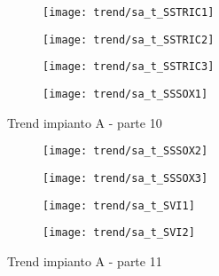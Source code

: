 \begin{sidewaysfigure}[h]\ContinuedFloat
	\renewcommand*\thesubfigure{(\arabic{subfigure})}
	\begin{subfigure}{0.49\textwidth}
		\texttt{[image: trend/sa\_t\_SSTRIC1]}
		\caption{}
		\centering
	\end{subfigure}
	\begin{subfigure}{0.49\textwidth}
		\texttt{[image: trend/sa\_t\_SSTRIC2]}
		\caption{}
		\centering
	\end{subfigure}

	\begin{subfigure}{0.49\textwidth}
		\texttt{[image: trend/sa\_t\_SSTRIC3]}
		\caption{}
		\centering
	\end{subfigure}
	\begin{subfigure}{0.49\textwidth}
		\texttt{[image: trend/sa\_t\_SSSOX1]}	
		\caption{}
		\centering
	\end{subfigure}
	\caption{Trend impianto A - parte 10}
\end{sidewaysfigure}

\begin{sidewaysfigure}[h]\ContinuedFloat
	\renewcommand*\thesubfigure{(\arabic{subfigure})}
	\begin{subfigure}{0.49\textwidth}
		\texttt{[image: trend/sa\_t\_SSSOX2]}
		\caption{}
		\centering
	\end{subfigure}
	\begin{subfigure}{0.49\textwidth}
		\texttt{[image: trend/sa\_t\_SSSOX3]}
		\caption{}
		\centering
	\end{subfigure}

	\begin{subfigure}{0.49\textwidth}
		\texttt{[image: trend/sa\_t\_SVI1]}
		\caption{}
		\centering
	\end{subfigure}
	\begin{subfigure}{0.49\textwidth}
		\texttt{[image: trend/sa\_t\_SVI2]}	
		\caption{}
		\centering
	\end{subfigure}
	\caption{Trend impianto A - parte 11}
\end{sidewaysfigure}

